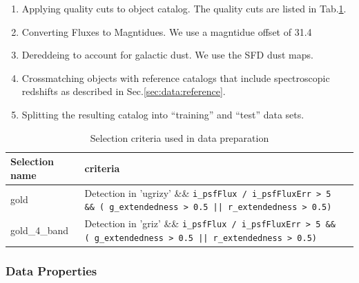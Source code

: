 \begin{enumerate}
\item{Applying quality cuts to object catalog.  The quality cuts are listed in Tab.\ref{tab:selection}.}
\item{Converting Fluxes to Magntidues.  We use a magntidue offset of 31.4}
\item{Dereddeing to account for galactic dust.   We use the SFD dust maps\cite{SFD}.}
\item{Crossmatching objects with reference catalogs that include spectroscopic redshifts as described in Sec.\ref{sec:data:reference}.}
\item{Splitting the resulting catalog into ``training'' and ``test'' data sets.}
\end{enumerate}


\begin{table}
\centering
\begin{tabular}{lll}
 \hline
    Selection name & criteria\\
 \hline
 \hline
  gold & Detection in 'ugrizy' \&\& \texttt{i\_psfFlux / i\_psfFluxErr > 5 \&\& ( g\_extendedness > 0.5 || r\_extendedness > 0.5)} \\
  gold\_4\_band & Detection in 'griz' \&\& \texttt{i\_psfFlux / i\_psfFluxErr > 5 \&\& ( g\_extendedness > 0.5 || r\_extendedness > 0.5)}  \\
 \hline
\end{tabular}
\caption{Selection criteria used in data preparation}
\label{tab:selection}
\end{table}

\subsubsection{Data Properties}
\label{sec:data:dp1:properties}


